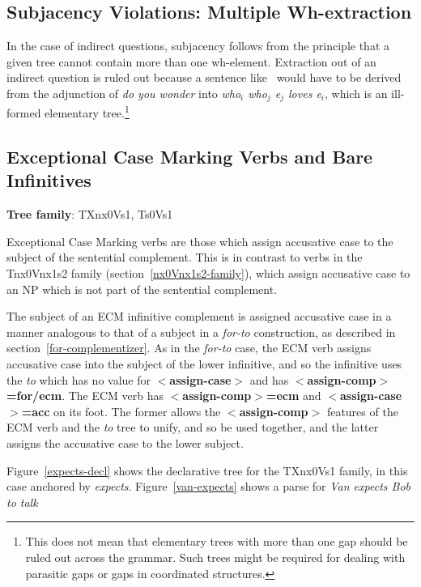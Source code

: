 \subsection{Subjacency Violations: Multiple Wh-extraction}

In the case of indirect questions, subjacency follows from the principle that a
given tree cannot contain more than one wh-element. Extraction out of an
indirect question is ruled out because a sentence like~ would have to be
derived from the adjunction of {\it do you wonder} into {\it who$_{i}$
who$_{j}$ e$_{j}$ loves e$_{i}$}, which is an ill-formed elementary
tree.\footnote{This does not mean that elementary trees with more than one gap
should be ruled out across the grammar. Such trees might be required for
dealing with parasitic gaps or gaps in coordinated structures.}




\subsection{Exceptional Case Marking Verbs and Bare Infinitives}
\label{ecm-verbs}

{\bf Tree family}: TXnx0Vs1, Ts0Vs1

Exceptional Case Marking verbs are those which assign accusative case to the
subject of the sentential complement. This is in contrast to verbs
in the Tnx0Vnx1s2 family (section~\ref{nx0Vnx1s2-family}), which assign 
accusative case to an NP which is not part of the sentential complement.  

The subject of an ECM infinitive complement is assigned accusative case in a
manner analogous to that of a subject in a {\it for-to\/} construction, as
described in section~\ref{for-complementizer}.  As in the {\it for-to\/} case,
the ECM verb assigns accusative case into the subject of the lower infinitive,
and so the infinitive uses the {\it to} which has no value for {\bf
$<$assign-case$>$} and has {\bf $<$assign-comp$>$=for/ecm}.  The ECM verb has
{\bf $<$assign-comp$>$=ecm} and {\bf $<$assign-case$>$=acc} on its foot.  The
former allows the {\bf $<$assign-comp$>$} features of the ECM verb and the {\it
to} tree to unify, and so be used together, and the latter assigns the
accusative case to the lower subject.

Figure~\ref{expects-decl} shows the declarative tree for the TXnx0Vs1 family,
in this case anchored by {\it expects}.  Figure~\ref{van-expects} shows a parse
for {\it Van expects Bob to talk}

